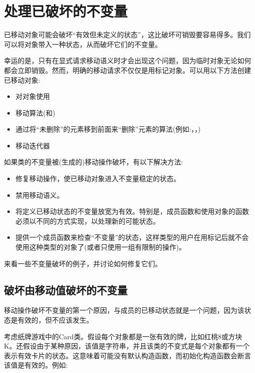 \section{处理已破坏的不变量}
已移动对象可能会破坏“有效但未定义的状态”，这比破坏可销毁要容易得多。我们可以将对象带入一种状态，从而破坏它们的不变量。

幸运的是，只有在显式请求移动语义时才会出现这个问题，因为临时对象无论如何都会立即销毁。然而，明确的移动请求不仅仅是用标记对象。可以用以下方法创建已移动对象:

\begin{itemize}
	\item 对对象使用
	\item 移动算法(和)
	\item 通过将“未删除”的元素移到前面来“删除”元素的算法(例如:，，)
	\item 移动迭代器
\end{itemize}

如果类的不变量被(生成的)移动操作破坏，有以下解决方法:

\begin{itemize}
	\item 修复移动操作，使已移动对象进入不变量稳定的状态。
	\item 禁用移动语义。
	\item 将定义已移动状态的不变量放宽为有效。特别是，成员函数和使用对象的函数必须以不同的方式实现，以处理新的可能状态。
	\item 提供一个成员函数来检查“不变量”的状态，这样类型的用户在用标记后就不会使用这种类型的对象了(或者只使用一组有限制的操作)。
\end{itemize}

来看一些不变量破坏的例子，并讨论如何修复它们。

\subsection{破坏由移动值破坏的不变量}

移动操作破坏不变量的第一个原因，与成员的已移动状态就是一个问题，因为该状态是有效的，但不应该发生。

考虑纸牌游戏中的Card类。假设每个对象都是一张有效的牌，比如红桃8或方块K。还假设由于某种原因，该值是字符串，并且该类的不变式是每个对象都有一个表示有效卡片的状态。这意味着可能没有默认构造函数，而初始化构造函数会断言该值是有效的。例如:

